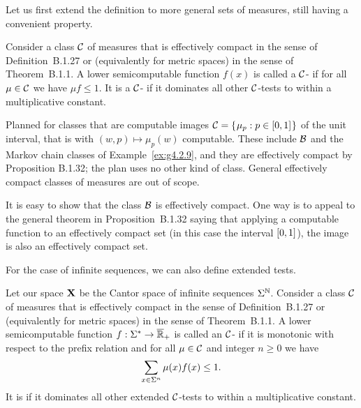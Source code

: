 Let us first extend the definition to more general sets of measures, still
having a convenient property.
 
 \begin{definition}\label{def:C-test}
Consider a class \( \mathcal{C} \) of measures that is effectively
compact in the sense of Definition~B.1.27 or (equivalently
for metric spaces) in the sense of Theorem~B.1.1.
A lower semicomputable function \( f(x) \) is called a \( \mathcal{C} \)- if for all
\( \mu\in\mathcal{C} \) we have \( \mu f\le 1 \).
It is a  \( \mathcal{C} \)- if it dominates all other \( \mathcal{C} \)-tests to
within a multiplicative constant.
\end{definition}

\begin{formalization}
Planned for classes that are computable images $\mathcal{C} = \mathopen\{\mskip 1mu\mu_{p} : p\in[0,1]\mskip 1mu\mathclose\}$ of the
unit interval, that is with $(w,p)\mapsto\mu_{p}(w)$ computable. These include $\mathcal{B}$ and the
Markov chain classes of Example~\ref{ex:g4.2.9}, and they are effectively compact by
Proposition B.1.32; the plan uses no other kind of class. General effectively compact classes of
measures are out of scope.
\end{formalization}

\begin{example}
  \label{ex:g4.2.3}
It is easy to show that the class \( \mathcal{B} \) is effectively compact.
One way is to appeal to the general theorem in
Proposition~B.1.32 saying that applying a computable
function to an effectively compact set (in this case the interval
\( [0,1] \)), the image is also an effectively compact set.
\end{example}

For the case of infinite sequences, we can also define extended tests.

 \begin{definition}
  \label{def:g4.2.4}
Let our space \( \mathbf{X} \) be the Cantor space of infinite sequences \( \Sigma^{\mathbb{N}} \).
Consider a class \( \mathcal{C} \) of measures that is effectively
compact in the sense of Definition~B.1.27 or (equivalently
for metric spaces) in the sense of Theorem~B.1.1.
A lower semicomputable function \( f:\Sigma^{*}\to\overline{\mathbb{R}}_{+} \) 
is called an  \( \mathcal{C} \)- if it is monotonic with respect to
the prefix relation and for all \( \mu\in\mathcal{C} \) and integer \( n\ge 0 \) we have 
 \begin{align*}
  \sum_{x\in\Sigma^{n}}\mu(x) f(x) \le 1.   
 \end{align*}
It is  if it dominates all other extended \( \mathcal{C} \)-tests to
within a multiplicative constant.
\end{definition}

